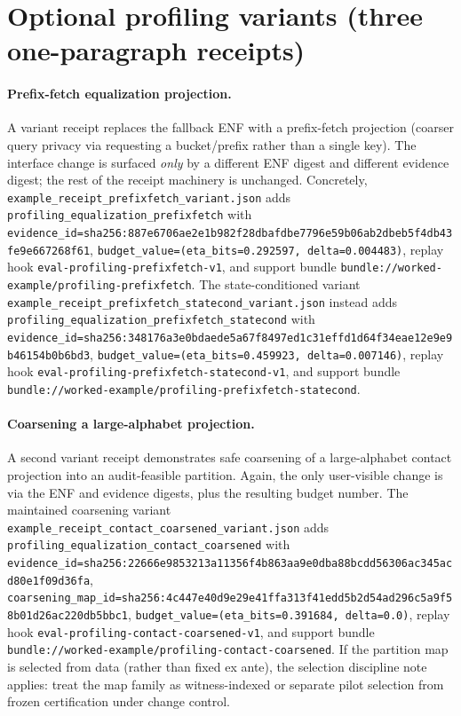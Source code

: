 \documentclass[11pt]{article}
\begin{document}
\section{Optional profiling variants (three one-paragraph receipts)}
\paragraph{Prefix-fetch equalization projection.}
A variant receipt replaces the fallback ENF with a prefix-fetch projection (coarser query privacy via requesting a bucket/prefix rather than a single key).
The interface change is surfaced \emph{only} by a different ENF digest and different evidence digest; the rest of the receipt machinery is unchanged.\cite{series:prefixcapacities,series:stataudit}
Concretely, \nolinkurl{example\_receipt\_prefixfetch\_variant.json} adds \nolinkurl{profiling\_equalization\_prefixfetch} with \nolinkurl{evidence\_id=sha256:887e6706ae2e1b982f28dbafdbe7796e59b06ab2dbeb5f4db43fe9e667268f61}, \nolinkurl{budget\_value=(eta\_bits=0.292597, delta=0.004483)}, replay hook \nolinkurl{eval-profiling-prefixfetch-v1}, and support bundle \nolinkurl{bundle://worked-example/profiling-prefixfetch}.
The state-conditioned variant \nolinkurl{example\_receipt\_prefixfetch\_statecond\_variant.json} instead adds \nolinkurl{profiling\_equalization\_prefixfetch\_statecond} with \nolinkurl{evidence\_id=sha256:348176a3e0bdaede5a67f8497ed1c31effd1d64f34eae12e9e9b46154b0b6bd3}, \nolinkurl{budget\_value=(eta\_bits=0.459923, delta=0.007146)}, replay hook \nolinkurl{eval-profiling-prefixfetch-statecond-v1}, and support bundle \nolinkurl{bundle://worked-example/profiling-prefixfetch-statecond}.

\paragraph{Coarsening a large-alphabet projection.}
A second variant receipt demonstrates safe coarsening of a large-alphabet contact projection into an audit-feasible partition.
Again, the only user-visible change is via the ENF and evidence digests, plus the resulting budget number.\cite{series:coarsening}
The maintained coarsening variant \nolinkurl{example\_receipt\_contact\_coarsened\_variant.json} adds \nolinkurl{profiling\_equalization\_contact\_coarsened} with \nolinkurl{evidence\_id=sha256:22666e9853213a11356f4b863aa9e0dba88bcdd56306ac345acd80e1f09d36fa}, \nolinkurl{coarsening\_map\_id=sha256:4c447e40d9e29e41ffa313f41edd5b2d54ad296c5a9f58b01d26ac220db5bbc1}, \nolinkurl{budget\_value=(eta\_bits=0.391684, delta=0.0)}, replay hook \nolinkurl{eval-profiling-contact-coarsened-v1}, and support bundle \nolinkurl{bundle://worked-example/profiling-contact-coarsened}.
If the partition map is selected from data (rather than fixed ex ante), the selection discipline note applies: treat the map family as witness-indexed or separate pilot selection from frozen certification under change control.\cite{series:selectiondiscipline}
\end{document}
